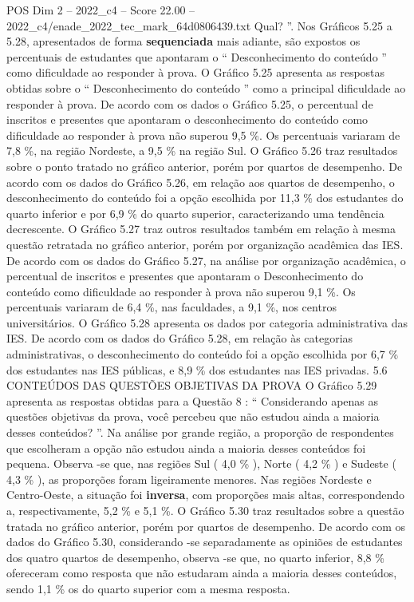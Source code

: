 \begin{textsample}{POS Dim 2 – 2022\_c4 – Score 22.00 – 2022\_c4/enade\_2022\_tec\_mark\_64d0806439.txt}
Qual? ”.
Nos Gráficos 5.25 a 5.28, apresentados de forma \textbf{sequenciada} mais adiante, são expostos os percentuais de estudantes que apontaram o “ Desconhecimento do conteúdo ” como dificuldade ao responder à prova.
O Gráfico 5.25 apresenta as respostas obtidas sobre o “ Desconhecimento do conteúdo ” como a principal dificuldade ao responder à prova.
De acordo com os dados o Gráfico 5.25, o percentual de inscritos e presentes que apontaram o desconhecimento do conteúdo como dificuldade ao responder à prova não superou 9,5 \%.
Os percentuais variaram de 7,8 \%, na região Nordeste, a 9,5 \% na região Sul.
O Gráfico 5.26 traz resultados sobre o ponto tratado no gráfico anterior, porém por quartos de desempenho.
De acordo com os dados do Gráfico 5.26, em relação aos quartos de desempenho, o desconhecimento do conteúdo foi a opção escolhida por 11,3 \% dos estudantes do quarto inferior e por 6,9 \% do quarto superior, caracterizando uma tendência decrescente.
O Gráfico 5.27 traz outros resultados também em relação à mesma questão retratada no gráfico anterior, porém por organização acadêmica das IES.
De acordo com os dados do Gráfico 5.27, na análise por organização acadêmica, o percentual de inscritos e presentes que apontaram o Desconhecimento do conteúdo como dificuldade ao responder à prova não superou 9,1 \%.
Os percentuais variaram de 6,4 \%, nas faculdades, a 9,1 \%, nos centros universitários.
O Gráfico 5.28 apresenta os dados por categoria administrativa das IES.
De acordo com os dados do Gráfico 5.28, em relação às categorias administrativas, o desconhecimento do conteúdo foi a opção escolhida por 6,7 \% dos estudantes nas IES públicas, e 8,9 \% dos estudantes nas IES privadas. 5.6 CONTEÚDOS DAS QUESTÕES OBJETIVAS DA PROVA O Gráfico 5.29 apresenta as respostas obtidas para a Questão 8 : “ Considerando apenas as questões objetivas da prova, você percebeu que não estudou ainda a maioria desses conteúdos? ”.
Na análise por grande região, a proporção de respondentes que escolheram a opção não estudou ainda a maioria desses conteúdos foi pequena.
Observa -se que, nas regiões Sul ( 4,0 \% ), Norte ( 4,2 \% ) e Sudeste ( 4,3 \% ), as proporções foram ligeiramente menores.
Nas regiões Nordeste e Centro-Oeste, a situação foi \textbf{inversa}, com proporções mais altas, correspondendo a, respectivamente, 5,2 \% e 5,1 \%.
O Gráfico 5.30 traz resultados sobre a questão tratada no gráfico anterior, porém por quartos de desempenho.
De acordo com os dados do Gráfico 5.30, considerando -se separadamente as opiniões de estudantes dos quatro quartos de desempenho, observa -se que, no quarto inferior, 8,8 \% ofereceram como resposta que não estudaram ainda a maioria desses conteúdos, sendo 1,1 \% os do quarto superior com a mesma resposta.

\end{textsample}
